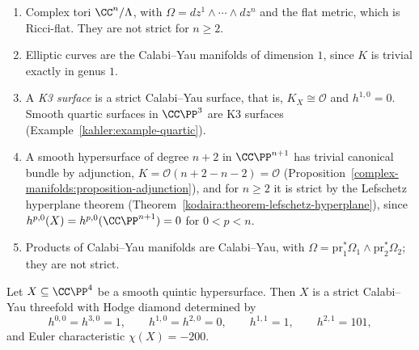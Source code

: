 \begin{example}\label{calabi-yau:example-calabi-yau}
\begin{enumerate}
\item Complex tori $\CC^n/\Lambda$, with $\Omega = dz^1 \wedge \cdots \wedge dz^n$ and the flat metric, which is Ricci-flat. They are not strict for $n \geq 2$.
\item Elliptic curves are the Calabi--Yau manifolds of dimension $1$, since $K$ is trivial exactly in genus $1$.
\item A \emph{K3 surface} is a strict Calabi--Yau surface, that is, $K_X \cong \mathcal{O}$ and $h^{1,0} = 0$. Smooth quartic surfaces in $\CC\PP^3$ are K3 surfaces
(Example~\ref{kahler:example-quartic}).
\item A smooth hypersurface of degree $n + 2$ in $\CC\PP^{n+1}$ has trivial canonical bundle by adjunction, $K = \mathcal{O}(n + 2 - n - 2) = \mathcal{O}$
(Proposition~\ref{complex-manifolds:proposition-adjunction}), and for $n \geq 2$ it is strict by the Lefschetz hyperplane theorem
(Theorem~\ref{kodaira:theorem-lefschetz-hyperplane}), since $h^{p,0}(X) = h^{p,0}(\CC\PP^{n+1}) = 0$ for $0 < p < n$.
\item Products of Calabi--Yau manifolds are Calabi--Yau, with $\Omega = \mathrm{pr}_1^*\Omega_1 \wedge \mathrm{pr}_2^*\Omega_2$; they are not strict.
\end{enumerate}
\end{example}

\begin{proposition}\label{calabi-yau:proposition-quintic}
Let $X \subseteq \CC\PP^4$ be a smooth quintic hypersurface. Then $X$ is a strict Calabi--Yau threefold with Hodge diamond determined by
\[
h^{0,0} = h^{3,0} = 1, \qquad h^{1,0} = h^{2,0} = 0, \qquad h^{1,1} = 1, \qquad h^{2,1} = 101,
\]
and Euler characteristic $\chi(X) = -200$.
\end{proposition}

